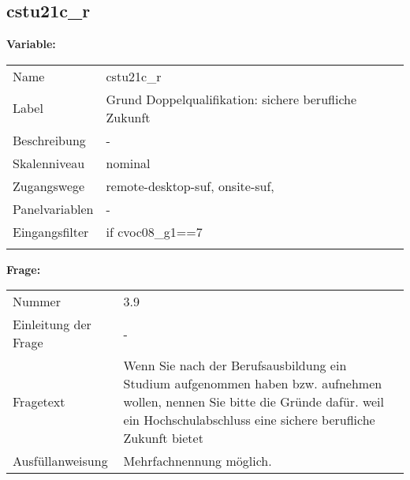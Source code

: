 	
	
	\subsection{cstu21c\_r}
	\label{subSection:cstu21c_r}

	\noindent\textbf{Variable:}\\
		\begin{tabular}{lL{11.3cm}}
			\label{tableVariable:cstu21c_r}
			Name & cstu21c\_r \\
			Label & Grund Doppelqualifikation: sichere berufliche Zukunft \\
			Beschreibung & - \\
			Skalenniveau & nominal \\
			Zugangswege &
				remote-desktop-suf,
				onsite-suf,
 \\
			Panelvariablen & -
			 \\
			Eingangsfilter & if cvoc08\_g1==7 \\
 \\
		\end{tabular}

		\vspace*{1 cm}
		\noindent\textbf{Frage:}\\
		\begin{tabular}{lL{11.3cm}}
			\label{tableQuestion:cstu21c_r}
			Nummer & 3.9 \\
			Einleitung der Frage & - \\
			Fragetext & Wenn Sie nach der Berufsausbildung ein Studium aufgenommen haben bzw. aufnehmen wollen, nennen Sie bitte die Gründe dafür. 
weil ein Hochschulabschluss eine sichere berufliche Zukunft bietet \\
			Ausfüllanweisung & Mehrfachnennung möglich. \\
		\end{tabular}





